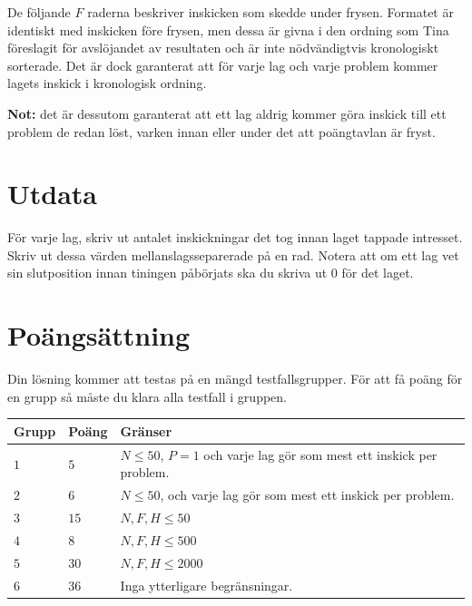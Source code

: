 De följande $F$ raderna beskriver inskicken som skedde under frysen.
Formatet är identiskt med inskicken före frysen, men dessa är givna i den ordning som Tina föreslagit för avslöjandet av resultaten och är inte nödvändigtvis kronologiskt sorterade.
Det är dock garanterat att för varje lag och varje problem kommer lagets inskick i kronologisk ordning.

\textbf{Not:} det är dessutom garanterat att ett lag aldrig kommer göra inskick till ett problem de redan löst,
varken innan eller under det att poängtavlan är fryst.

\section*{Utdata}
För varje lag, skriv ut antalet inskickningar det tog innan laget tappade intresset.
Skriv ut dessa värden mellanslagsseparerade på en rad.
Notera att om ett lag vet sin slutposition innan tiningen påbörjats ska du skriva ut $0$ för det laget.

\section*{Poängsättning}
Din lösning kommer att testas på en mängd testfallsgrupper.
För att få poäng för en grupp så måste du klara alla testfall i gruppen.



\noindent
\begin{tabular}{| l | l | p{12cm} |}
  \hline
  \textbf{Grupp} & \textbf{Poäng} & \textbf{Gränser} \\ \hline
  $1$    & $5$        & $N \leq 50$, $P=1$ och varje lag gör som mest ett inskick per problem. \\ \hline
  $2$    & $6$        & $N \leq 50$, och varje lag gör som mest ett inskick per problem. \\ \hline
  $3$    & $15$       & $N,F,H \leq 50$ \\ \hline
  $4$    & $8$        & $N,F,H \leq 500$ \\ \hline
  $5$    & $30$       & $N,F,H \leq 2000$ \\ \hline
  $6$    & $36$       & Inga ytterligare begränsningar. \\ \hline
\end{tabular}


